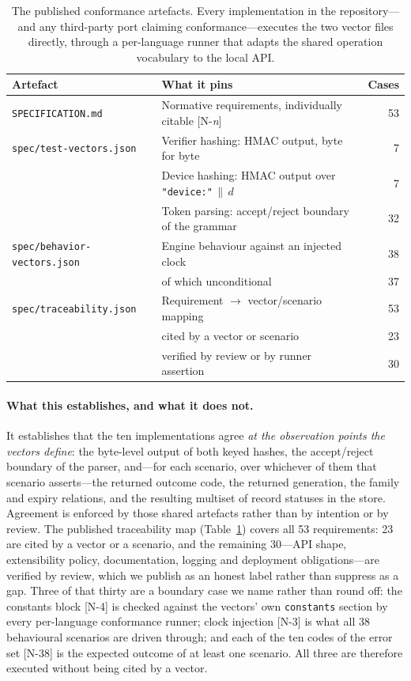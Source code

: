 \documentclass[11pt]{article}
\begin{document}
\begin{table}[t]
\centering\small
\caption{The published conformance artefacts. Every implementation in the
repository---and any third-party port claiming conformance---executes the
two vector files directly, through a per-language runner that adapts the
shared operation vocabulary to the local API.}
\label{tab:artifacts}
\begin{tabular}{@{}l l r@{}}
\toprule
Artefact & What it pins & Cases \\
\midrule
\texttt{SPECIFICATION.md}
  & Normative requirements, individually citable [N-\emph{n}] & 53 \\[2pt]
\texttt{spec/test-vectors.json}
  & Verifier hashing: HMAC output, byte for byte & 7 \\
  & Device hashing: HMAC output over \texttt{"device:"}\,$\|$\,$d$ & 7 \\
  & Token parsing: accept/reject boundary of the grammar & 32 \\[2pt]
\texttt{spec/behavior-vectors.json}
  & Engine behaviour against an injected clock & 38 \\
  & \quad of which unconditional & 37 \\[2pt]
\texttt{spec/traceability.json}
  & Requirement $\rightarrow$ vector/scenario mapping & 53 \\
  & \quad cited by a vector or scenario & 23 \\
  & \quad verified by review or by runner assertion & 30 \\
\bottomrule
\end{tabular}
\end{table}

\paragraph{What this establishes, and what it does not.} It establishes that
the ten implementations agree \emph{at the observation points the vectors
define}: the byte-level output of both keyed hashes, the accept/reject
boundary of the parser, and---for each scenario, over whichever of them that
scenario asserts---the returned outcome code, the returned generation, the
family and expiry relations, and the resulting multiset of record statuses in
the store. Agreement is enforced by those
shared artefacts rather than by intention or by review. The published
traceability map (Table~\ref{tab:artifacts}) covers all 53 requirements: 23
are cited by a vector or a scenario, and the remaining 30---API shape,
extensibility policy, documentation, logging and deployment obligations---are
verified by review, which we publish as an honest label rather than suppress
as a gap. Three of that thirty are a boundary case we name rather than round
off: the constants block [N-4] is checked against the vectors' own
\texttt{constants} section by every per-language conformance runner; clock
injection [N-3] is what all 38 behavioural scenarios are driven through; and
each of the ten codes of the error set [N-38] is the expected outcome of at
least one scenario. All three are therefore executed without being cited by a
vector.
\end{document}
